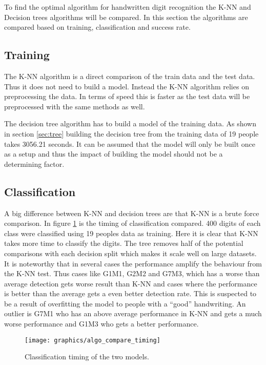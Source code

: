 To find the optimal algorithm for handwritten digit recognition the K-NN and Decision trees algorithms will be compared.
In this section the algorithms are compared based on training, classification and success rate.

\subsection{Training}
The K-NN algorithm is a direct comparison of the train data and the test data.
Thus it does not need to build a model.
Instead the K-NN algorithm relies on preprocessing the data.
In terms of speed this is faster as the test data will be preprocessed with the same methods as well.

The decision tree algorithm has to build a model of the training data. 
As shown in section \ref{sec:tree} building the decision tree from the training data of 19 people takes 3056.21 seconds.
It can be assumed that the model will only be built once as a setup and thus the impact of building the model should not be a determining factor.

\subsection{Classification}
A big difference between K-NN and decision trees are that K-NN is a brute force comparison.
In figure \ref{fig:algo_compare_timing} is the timing of classification compared.
400 digits of each class were classified using 19 peoples data as training.
Here it is clear that K-NN takes more time to classify the digits.
The tree removes half of the potential comparisons with each decision split which makes it scale well on large datasets.
It is noteworthy that in several cases the performance amplify the behaviour from the K-NN test.
Thus cases like G1M1, G2M2 and G7M3, which has a worse than average detection gets worse result than K-NN 
and cases where the performance is better than the average gets a even better detection rate.
This is suspected to be a result of overfitting the model to people with a ``good'' handwriting.
An outlier is G7M1 who has an above average performance in K-NN and gets a much worse performance and G1M3 who gets a better performance.


\begin{figure}[H]
\centering
\texttt{[image: graphics/algo\_compare\_timing]}
\caption{Classification timing of the two models.}
\label{fig:algo_compare_timing}
\end{figure}

